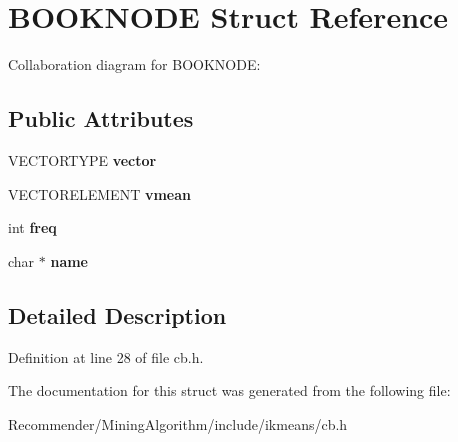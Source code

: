\section{BOOKNODE Struct Reference}
\label{structBOOKNODE}
Collaboration diagram for BOOKNODE:\subsection*{Public Attributes}
\begin{CompactItemize}
\item 
VECTORTYPE {\bf vector}\label{structBOOKNODE_9ef16bb45c3f3dc7e24496364c1a17bf}

\item 
VECTORELEMENT {\bf vmean}\label{structBOOKNODE_1ba0bdcc200c4116feec1e97a9bc027a}

\item 
int {\bf freq}\label{structBOOKNODE_e0d22272b68e75d19ac0b80c01f806b6}

\item 
char $\ast$ {\bf name}\label{structBOOKNODE_5ac083a645d964373f022d03df4849c8}

\end{CompactItemize}


\subsection{Detailed Description}




Definition at line 28 of file cb.h.

The documentation for this struct was generated from the following file:\begin{CompactItemize}
\item 
Recommender/MiningAlgorithm/include/ikmeans/cb.h\end{CompactItemize}
